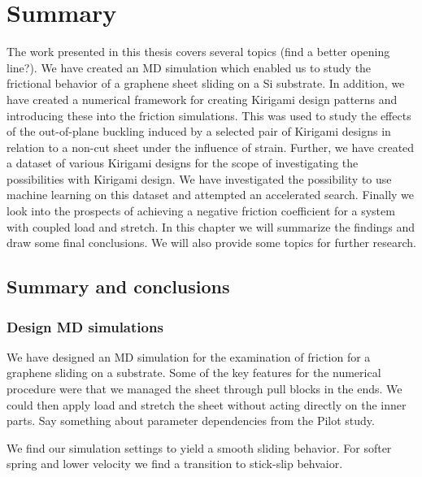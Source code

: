 \chapter{Summary}\label{chap:summary}

The work presented in this thesis covers several topics (find a better opening
line?). We have created an \acrshort{MD} simulation which enabled us to study
the frictional behavior of a graphene sheet sliding on a Si substrate. In
addition, we have created a numerical framework for creating Kirigami design
patterns and introducing these into the friction simulations. This was used to
study the effects of the out-of-plane buckling induced by a selected pair of
Kirigami designs in relation to a non-cut sheet under the influence of strain.
Further, we have created a dataset of various Kirigami designs for the scope of
investigating the possibilities with Kirigami design. We have investigated the
possibility to use machine learning on this dataset and attempted an accelerated
search. Finally we look into the prospects of achieving a negative friction
coefficient for a system with coupled load and stretch. In this chapter we will
summarize the findings and draw some final conclusions. We will also provide
some topics for further research.

\section{Summary and conclusions}

\subsection{Design MD simulations}
We have designed an \acrshort{MD} simulation for the examination of friction for a graphene sliding on a substrate. Some of the key features for the numerical procedure were that we managed the sheet through pull blocks in the ends. We could then apply load and stretch the sheet without acting directly on the inner parts. Say something about parameter dependencies from the Pilot study. 


We find our simulation settings to yield a smooth sliding behavior. For softer spring and lower velocity we find a transition to stick-slip behvaior. 

